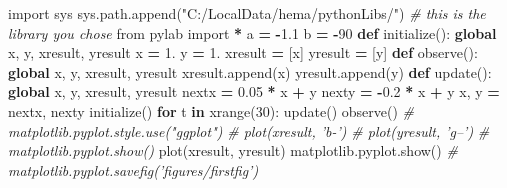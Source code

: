 \documentclass[]{article}
\newenvironment{Shaded}{\begin{snugshade}}{\end{snugshade}}
\newcommand{\KeywordTok}[1]{\textcolor[rgb]{0.13,0.29,0.53}{\textbf{#1}}}
\newcommand{\DecValTok}[1]{\textcolor[rgb]{0.00,0.00,0.81}{#1}}
\newcommand{\FloatTok}[1]{\textcolor[rgb]{0.00,0.00,0.81}{#1}}
\newcommand{\StringTok}[1]{\textcolor[rgb]{0.31,0.60,0.02}{#1}}
\newcommand{\ImportTok}[1]{#1}
\newcommand{\CommentTok}[1]{\textcolor[rgb]{0.56,0.35,0.01}{\textit{#1}}}
\newcommand{\ControlFlowTok}[1]{\textcolor[rgb]{0.13,0.29,0.53}{\textbf{#1}}}
\newcommand{\OperatorTok}[1]{\textcolor[rgb]{0.81,0.36,0.00}{\textbf{#1}}}
\newcommand{\BuiltInTok}[1]{#1}
\newcommand{\NormalTok}[1]{#1}
\begin{document}
\begin{Shaded}
\begin{Highlighting}[]
\ImportTok{import}\NormalTok{ sys}
\NormalTok{sys.path.append(}\StringTok{"C:/LocalData/hema/pythonLibs/"}\NormalTok{) }\CommentTok{# this is the library you chose}
\ImportTok{from}\NormalTok{ pylab }\ImportTok{import} \OperatorTok{*}
\NormalTok{a }\OperatorTok{=} \OperatorTok{-}\FloatTok{1.1}
\NormalTok{b }\OperatorTok{=} \OperatorTok{-}\DecValTok{90}
\KeywordTok{def}\NormalTok{ initialize():}
    \KeywordTok{global}\NormalTok{ x, y, xresult, yresult}
\NormalTok{    x }\OperatorTok{=} \DecValTok{1}\NormalTok{.}
\NormalTok{    y }\OperatorTok{=} \DecValTok{1}\NormalTok{.}
\NormalTok{    xresult }\OperatorTok{=}\NormalTok{ [x]}
\NormalTok{    yresult }\OperatorTok{=}\NormalTok{ [y]}
\KeywordTok{def}\NormalTok{ observe():}
    \KeywordTok{global}\NormalTok{ x, y, xresult, yresult}
\NormalTok{    xresult.append(x)}
\NormalTok{    yresult.append(y)}
\KeywordTok{def}\NormalTok{ update():}
    \KeywordTok{global}\NormalTok{ x, y, xresult, yresult}
\NormalTok{    nextx }\OperatorTok{=} \FloatTok{0.05} \OperatorTok{*}\NormalTok{ x }\OperatorTok{+}\NormalTok{ y}
\NormalTok{    nexty }\OperatorTok{=} \OperatorTok{-}\FloatTok{0.2} \OperatorTok{*}\NormalTok{ x }\OperatorTok{+}\NormalTok{ y}
\NormalTok{    x, y }\OperatorTok{=}\NormalTok{ nextx, nexty}
\NormalTok{initialize()}
\ControlFlowTok{for}\NormalTok{ t }\KeywordTok{in} \BuiltInTok{xrange}\NormalTok{(}\DecValTok{30}\NormalTok{):}
\NormalTok{  update()}
\NormalTok{  observe()}
\CommentTok{# matplotlib.pyplot.style.use("ggplot")}
\CommentTok{# plot(xresult, 'b-')}
\CommentTok{# plot(yresult, 'g--')}
\CommentTok{# matplotlib.pyplot.show()}
\NormalTok{plot(xresult, yresult)}
\NormalTok{matplotlib.pyplot.show()}
\CommentTok{# matplotlib.pyplot.savefig('figures/firstfig')}
\end{Highlighting}
\end{Shaded}
\end{document}
